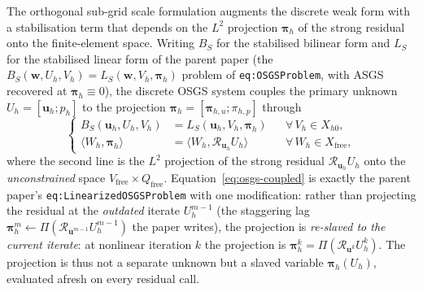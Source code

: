 \documentclass{article}
\newcommand{\code}[1]{\texttt{\small #1}}
\begin{document}
The orthogonal sub-grid scale formulation augments the discrete weak
form with a stabilisation term that depends on the $L^2$ projection
$\boldsymbol{\pi}_h$ of the strong residual onto the finite-element
space. Writing $B_S$ for the stabilised bilinear form and $L_S$ for the
stabilised linear form of the parent paper (the
$B_S(\boldsymbol{w}, U_h, V_h) = L_S(\boldsymbol{w}, V_h, \boldsymbol{\pi}_h)$
problem of \code{eq:OSGSProblem}, with ASGS recovered at
$\boldsymbol{\pi}_h \equiv 0$), the discrete OSGS system couples the
primary unknown $U_h = [\boldsymbol{u}_h; p_h]$ to the projection
$\boldsymbol{\pi}_h = [\boldsymbol{\pi}_{h,u}; \pi_{h,p}]$ through
\begin{equation}
\label{eq:osgs-coupled}
\left\{
\begin{aligned}
B_S(\boldsymbol{u}_h, U_h, V_h) &= L_S(\boldsymbol{u}_h, V_h, \boldsymbol{\pi}_h)
   && \forall\, V_h \in X_{h0}, \\
\langle W_h, \boldsymbol{\pi}_h \rangle
   &= \langle W_h, \mathcal{R}_{\boldsymbol{u}_h} U_h \rangle
   && \forall\, W_h \in X_{\mathrm{free}},
\end{aligned}
\right.
\end{equation}
where the second line is the $L^2$ projection of the strong residual
$\mathcal{R}_{\boldsymbol{u}_h} U_h$ onto the \emph{unconstrained} space
$V_{\mathrm{free}} \times Q_{\mathrm{free}}$. Equation~\eqref{eq:osgs-coupled}
is exactly the parent paper's
\code{eq:LinearizedOSGSProblem} with one modification: rather than
projecting the residual at the \emph{outdated} iterate $U_h^{m-1}$ (the
staggering lag $\boldsymbol{\pi}_h^m \gets \Pi(\mathcal{R}_{\boldsymbol{u}^{m-1}} U_h^{m-1})$
the paper writes), the projection is \emph{re-slaved to the current
iterate}: at nonlinear iteration $k$ the projection is
$\boldsymbol{\pi}_h^k = \Pi(\mathcal{R}_{\boldsymbol{u}^k} U_h^k)$. The
projection is thus not a separate unknown but a slaved variable
$\boldsymbol{\pi}_h(U_h)$, evaluated afresh on every residual call.
\end{document}
